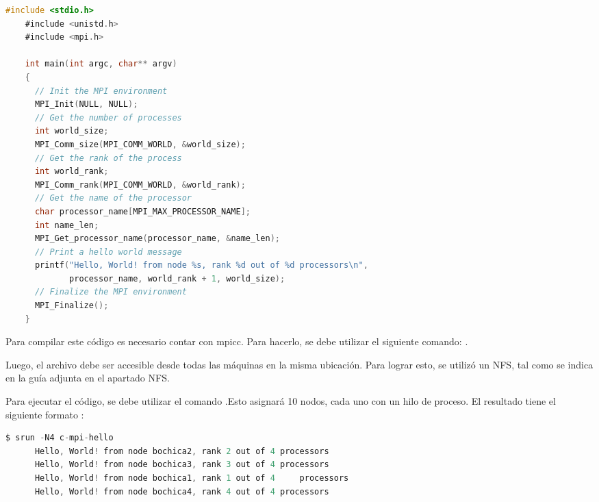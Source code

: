 \begin{spacing}{1.5}

  \begin{lstlisting}[language=C]
    #include <stdio.h>
    #include <unistd.h>
    #include <mpi.h>
    
    int main(int argc, char** argv)
    {
      // Init the MPI environment
      MPI_Init(NULL, NULL);
      // Get the number of processes
      int world_size;
      MPI_Comm_size(MPI_COMM_WORLD, &world_size);
      // Get the rank of the process
      int world_rank;
      MPI_Comm_rank(MPI_COMM_WORLD, &world_rank);
      // Get the name of the processor
      char processor_name[MPI_MAX_PROCESSOR_NAME];
      int name_len;
      MPI_Get_processor_name(processor_name, &name_len);
      // Print a hello world message
      printf("Hello, World! from node %s, rank %d out of %d processors\n",
             processor_name, world_rank + 1, world_size);
      // Finalize the MPI environment
      MPI_Finalize();
    }
    \end{lstlisting}

  Para compilar este código es necesario contar con mpicc. Para hacerlo, se
  debe utilizar el siguiente comando: .

  Luego, el archivo debe ser accesible desde todas las máquinas en la misma
  ubicación. Para lograr esto, se utilizó un NFS, tal como se indica en la guía
  adjunta en el apartado NFS.

  Para ejecutar el código, se debe utilizar el comando .Esto asignará 10 nodos, cada uno con un hilo de proceso. El resultado tiene el siguiente formato :

  \begin{lstlisting}[language=C]
      $ srun -N4 c-mpi-hello
      Hello, World! from node bochica2, rank 2 out of 4 processors
      Hello, World! from node bochica3, rank 3 out of 4 processors
      Hello, World! from node bochica1, rank 1 out of 4     processors
      Hello, World! from node bochica4, rank 4 out of 4 processors
    \end{lstlisting}


\end{spacing}
